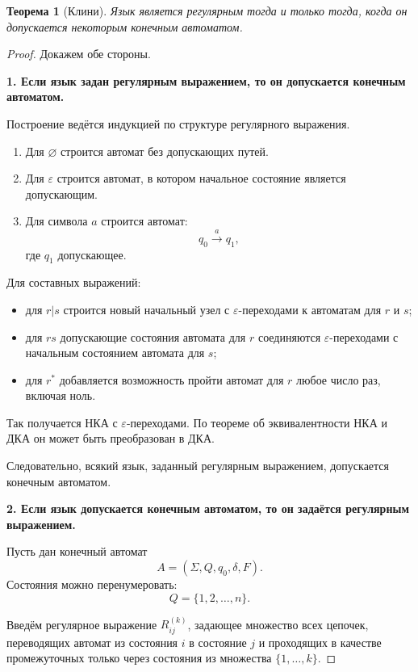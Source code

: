 \documentclass[12pt,a4paper]{article}
\newtheorem{theorem}{Теорема}
\newcommand{\eps}{\varepsilon}
\begin{document}
\begin{theorem}[Клини]
Язык является регулярным тогда и только тогда, когда он допускается некоторым конечным автоматом.
\end{theorem}

\begin{proof}
Докажем обе стороны.

\textbf{1. Если язык задан регулярным выражением, то он допускается конечным автоматом.}

Построение ведётся индукцией по структуре регулярного выражения.

\begin{enumerate}
    \item Для $\varnothing$ строится автомат без допускающих путей.
    \item Для $\eps$ строится автомат, в котором начальное состояние является допускающим.
    \item Для символа $a$ строится автомат:
    \[
    q_0 \xrightarrow{a} q_1,
    \]
    где $q_1$ допускающее.
\end{enumerate}

Для составных выражений:
\begin{itemize}
    \item для $r|s$ строится новый начальный узел с $\eps$-переходами к автоматам для $r$ и $s$;
    \item для $rs$ допускающие состояния автомата для $r$ соединяются $\eps$-переходами с начальным состоянием автомата для $s$;
    \item для $r^*$ добавляется возможность пройти автомат для $r$ любое число раз, включая ноль.
\end{itemize}

Так получается НКА с $\eps$-переходами. По теореме об эквивалентности НКА и ДКА он может быть преобразован в ДКА.

Следовательно, всякий язык, заданный регулярным выражением, допускается конечным автоматом.

\textbf{2. Если язык допускается конечным автоматом, то он задаётся регулярным выражением.}

Пусть дан конечный автомат
\[
A=(\Sigma,Q,q_0,\delta,F).
\]
Состояния можно перенумеровать:
\[
Q=\{1,2,\ldots,n\}.
\]

Введём регулярное выражение $R_{ij}^{(k)}$, задающее множество всех цепочек, переводящих автомат из состояния $i$ в состояние $j$ и проходящих в качестве промежуточных только через состояния из множества $\{1,\ldots,k\}$.


\end{proof}
\end{document}
